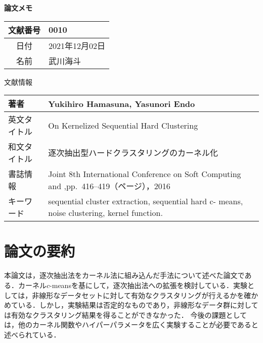 \documentclass[10pt,onecolumn]{jsarticle}
\begin{document}
\vspace{-20mm}
\begin{center}
{\LARGE\textbf{論文メモ}}
\end{center}

\begin{flushright}
\begin{tabular}{|c|l|}
\hline
文献番号  &  0010
\\
\hline
日付  &  2021年12月02日
\\
\hline
名前  &  武川海斗
\\
\hline
\end{tabular}
\end{flushright}


%
%
\begin{center}
{\large 文献情報}
\begin{table}[hbp]%
\begin{tabular}{|l||l|}
\hline
著者  &  Yukihiro Hamasuna, Yasunori Endo
\\ \hline
英文タイトル  & On Kernelized Sequential Hard Clustering
\\ \hline
和文タイトル  & 逐次抽出型ハードクラスタリングのカーネル化
\\ \hline
書誌情報  &  Joint 8th International Conference on Soft Computing and ,pp.~416--419（ページ），2016
\\ \hline
キーワード & sequential cluster extraction, sequential hard c- means, noise clustering, kernel function.
\\ \hline
\end{tabular}
\end{table}
\end{center}


\section{論文の要約}
本論文は，逐次抽出法をカーネル法に組み込んだ手法について述べた論文である．カーネル$c$-meansを基にして，逐次抽出法への拡張を検討している．実験としては，非線形なデータセットに対して有効なクラスタリングが行えるかを確かめている．しかし，実験結果は否定的なものであり，非線形なデータ群に対しては有効なクラスタリング結果を得ることができなかった．
今後の課題としては，他のカーネル関数やハイパーパラメータを広く実験することが必要であると述べられている．
\end{document}
